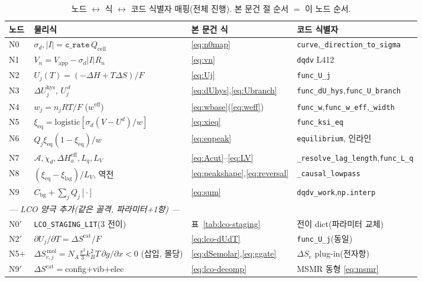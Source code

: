 \documentclass[11pt,a4paper]{article}
\newcommand{\eff}{\mathrm{eff}}
\newcommand{\eq}{\mathrm{eq}}
\newcommand{\app}{\mathrm{app}}
\newcommand{\cell}{\mathrm{cell}}
\newcommand{\bg}{\mathrm{bg}}
\newcommand{\hys}{\mathrm{hys}}
\newcommand{\code}[1]{\texttt{#1}}
\begin{document}
\begin{table}[t]
\centering
\renewcommand{\arraystretch}{1.3}
\caption{노드 $\leftrightarrow$ 식 $\leftrightarrow$ 코드 식별자 매핑(전체 진행). 본 문건 절 순서 $=$ 이 노드 순서.}
\label{tab:nodemap}
\begin{tabular}{l l l l}
\toprule
노드 & 물리식 & 본 문건 식 & 코드 식별자 \\
\midrule
N0 & $\sigma_d,|I|=\code{c\_rate}\,Q_\cell$ & \eqref{eq:n0map} & \code{curve},\code{\_direction\_to\_sigma} \\
N1 & $V_n=V_\app-\sigma_d|I|R_n$ & \eqref{eq:vn} & \code{dqdv} L412 \\
N2 & $U_j(T)=(-\Delta H+T\Delta S)/F$ & \eqref{eq:Uj} & \code{func\_U\_j} \\
N3 & $\Delta U_j^\hys$, $U_j^{\,d}$ & \eqref{eq:dUhys},\eqref{eq:Ubranch} & \code{func\_dU\_hys},\code{func\_U\_branch} \\
N4 & $w_j=n_jRT/F$ ($w^\eff$) & \eqref{eq:wbase}(\eqref{eq:weff}) & \code{func\_w},\code{func\_w\_eff},\code{\_width} \\
N5 & $\xi_\eq=\mathrm{logistic}[\sigma_d(V-U^d)/w]$ & \eqref{eq:xieq} & \code{func\_ksi\_eq} \\
N6 & $Q_j\xi_\eq(1-\xi_\eq)/w$ & \eqref{eq:eqpeak} & \code{equilibrium}, 인라인 \\
N7 & $\mathcal A,\chi_d,\Delta H_a^\eff,L_q,L_V$ & \eqref{eq:Acut}--\eqref{eq:LV} & \code{\_resolve\_lag\_length},\code{func\_L\_q} \\
N8 & $(\xi_\eq-\xi_\mathrm{lag})/L_V$, 역전 & \eqref{eq:peakshape},\eqref{eq:reversal} & \code{\_causal\_lowpass} \\
N9 & $C_\bg+\sum_jQ_j[\cdot]$ & \eqref{eq:sum} & \code{dqdv\_work},\code{np.interp} \\
\midrule
\multicolumn{4}{l}{\emph{— LCO 양극 추가(같은 골격, 파라미터+1항) —}}\\
N0$'$ & \code{LCO\_STAGING\_LIT}(3 전이) & 표~\ref{tab:lco-staging} & 전이 dict(파라미터 교체) \\
N2$'$ & $\partial U_j/\partial T=\Delta S^\mathrm{cat}/F$ & \eqref{eq:lco-dUdT} & \code{func\_U\_j}(동일) \\
N5$+$ & $\Delta S_{e,j}^{\,\mathrm{mol}}=N_A\tfrac{\pi^2}{3}k_B^2T\,\partial g/\partial x<0$ (삽입, 몰당) & \eqref{eq:dSemolar},\eqref{eq:ggate} & $\Delta S_e$ plug-in(전자항) \\
N9$'$ & $\Delta S^\mathrm{cat}=$config$+$vib$+$elec & \eqref{eq:lco-decomp} & MSMR 동형 \eqref{eq:msmr} \\
\bottomrule
\end{tabular}
\end{table}
\end{document}
